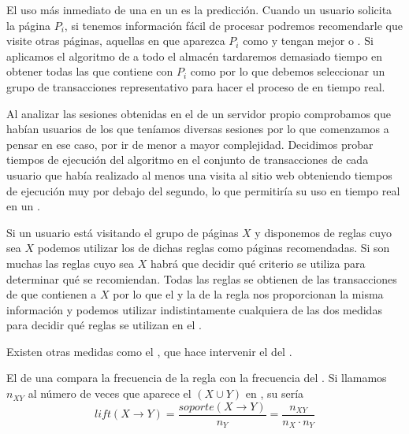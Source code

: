 El uso más inmediato de una \ar en un \srw es la predicción. Cuando un usuario solicita la página $P_i$, si tenemos información fácil de procesar podremos recomendarle que visite otras páginas, aquellas en que aparezca $P_i$ como \antecedente y tengan mejor \soporte o \confianza. Si aplicamos el algoritmo de \ARM a todo el almacén \D tardaremos demasiado tiempo en obtener todas las \ars que contiene con $P_i$ como \antecedente por lo que debemos seleccionar un grupo de transacciones representativo para hacer el proceso de \dm en tiempo real. 

Al analizar las sesiones obtenidas en el \flog de un servidor propio comprobamos que habían usuarios de los que teníamos diversas sesiones por lo que comenzamos a pensar en ese caso, por ir de menor a mayor complejidad. Decidimos probar tiempos de ejecución del algoritmo en el conjunto de transacciones de cada usuario que había realizado al menos una visita al sitio web obteniendo tiempos de ejecución muy por debajo del segundo, lo que permitiría su uso en tiempo real en un \srw.

Si un usuario está visitando el grupo de páginas $X$ y disponemos de reglas cuyo \antecedente sea $X$ podemos utilizar los \consecuentes de dichas reglas como páginas recomendadas. Si son muchas las reglas cuyo \antecedente sea $X$ habrá que decidir qué criterio se utiliza para determinar qué \consecuentes se recomiendan. Todas las reglas se obtienen de las transacciones de \D que contienen a $X$ por lo que el \soporte y la \confianza de la regla nos proporcionan la misma información y podemos utilizar indistintamente cualquiera de las dos medidas para decidir qué reglas se utilizan en el \SRW.

Existen otras medidas como el \lift, que hace intervenir el \soporte del \consecuente.

\begin{defn}[\lift]
   El \lift de una \AR compara la frecuencia de la regla con la frecuencia del \consecuente. Si llamamos $n_{XY}$ al número de veces que aparece el \itemset $(X \cup Y)$ en \D, su \lift sería
  \begin{equation}\label{eq:1-3-2-lift-AR}
    lift(X \rightarrow Y) = \frac{soporte(X \rightarrow Y)}{n_Y} = \frac{n_{XY}}{n_X\cdot n_Y}
  \end{equation}
\label{def:1:3:2:lift:ar}
\end{defn}

